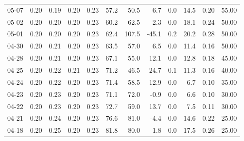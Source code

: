 \begin{threeparttable}
{\begin{tabular}{lrrrrrrrrrrr}
  05-07 &          0.20 &          0.19 &          0.20 &        0.23 &                57.2 &                50.5 &        6.7 &                 0.0 &             14.5 &            0.20 &                  55.00 \\
  05-02 &          0.20 &          0.20 &          0.20 &        0.23 &                60.2 &                62.5 &       -2.3 &                 0.0 &             18.1 &            0.24 &                  50.00 \\
  05-01 &          0.20 &          0.20 &          0.20 &        0.23 &                62.4 &               107.5 &      -45.1 &                 0.2 &             20.2 &            0.28 &                  50.00 \\
  04-30 &          0.20 &          0.21 &          0.20 &        0.23 &                63.5 &                57.0 &        6.5 &                 0.0 &             11.4 &            0.16 &                  50.00 \\
  04-28 &          0.20 &          0.21 &          0.20 &        0.23 &                67.1 &                55.0 &       12.1 &                 0.0 &             12.8 &            0.18 &                  45.00 \\
  04-25 &          0.20 &          0.22 &          0.21 &        0.23 &                71.2 &                46.5 &       24.7 &                 0.1 &             11.3 &            0.16 &                  40.00 \\
  04-24 &          0.20 &          0.22 &          0.20 &        0.23 &                71.4 &                58.5 &       12.9 &                 0.0 &              6.7 &            0.10 &                  35.00 \\
  04-23 &          0.20 &          0.23 &          0.20 &        0.23 &                71.1 &                72.0 &       -0.9 &                 0.0 &              6.6 &            0.10 &                  30.00 \\
  04-22 &          0.20 &          0.23 &          0.20 &        0.23 &                72.7 &                59.0 &       13.7 &                 0.0 &              7.5 &            0.11 &                  30.00 \\
  04-21 &          0.20 &          0.24 &          0.20 &        0.23 &                76.6 &                81.0 &       -4.4 &                 0.0 &             14.6 &            0.22 &                  25.00 \\
  04-18 &          0.20 &          0.25 &          0.20 &        0.23 &                81.8 &                80.0 &        1.8 &                 0.0 &             17.5 &            0.26 &                  25.00 \\

\end{tabular}}
\end{threeparttable}
